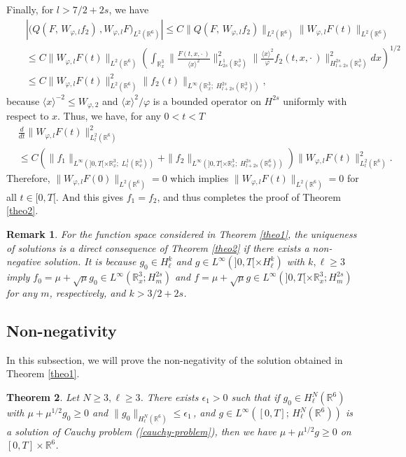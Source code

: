 \documentclass{amsart}[12pt, article]
\newtheorem{theo}{Theorem}[section]
\newtheorem{rema}[theo]{Remark}
\begin{document}
Finally, for $l>7/2+2s$, we have
\begin{eqnarray*}
&&\left|\Big(Q(F,\, W_{\varphi, l } f_2)\, ,W_{\varphi, l} F\Big)_{L^2({{{\mathbb R}}}^6)}\right|\leq C
\|Q( F,\, W_{\varphi,l} f_2)\|_{L^2({{{\mathbb R}}}^6)}\|W_{\varphi, l}F(t)\|_{L^2({{{\mathbb R}}}^6)}\\
&& \leq C \|W_{\varphi, l}F(t)\|_{L^2({{{\mathbb R}}}^6)} \left(\int_{{{{\mathbb R}}}^3_x}
\|\frac{F(t, x,\cdot\,)}{{{\langle}} x {{\rangle}}^2}\|^2_{L^{1}_{2s}({{{\mathbb R}}}^3_{v})}
\|\frac{{{\langle}} x {{\rangle}}^2}{\varphi}f_2(t, x, \cdot\,
)\|^2_{H^{2s}_{l+2s}({{{\mathbb R}}}^3_{v})} dx\right)^{1/2}\\
&&\leq C \|W_{\varphi,l}F(t)\|^2_{L^2({{{\mathbb R}}}^6)}\|f_2(t)\|_{L^\infty({{{\mathbb R}}}^3_x;\;
H^{2s}_{l+2s}({{{\mathbb R}}}^3_{v}))},
\end{eqnarray*}
because ${{\langle}} x {{\rangle}}^{-2} \leq W_{\varphi,2}$ and ${{\langle}} x {{\rangle}}^2/\varphi$ is a bounded
operator on $H^{2s}$ uniformly with respect to $x$.
Thus, we have, for any $0<t< T$
\begin{align*}
&\frac{d}{d t} \|W_{\varphi,l} F(t)\|^2_{L^2_l({{{\mathbb R}}}^6)} \\
&\leq C \left(
\|f_1\|_{L^\infty(]0, T[\times {{{\mathbb R}}}_x^3 ;\; L^1_{l}({{{\mathbb R}}}^3_{v}))}+
\|f_2\|_{L^\infty(]0, T[  \times {{{\mathbb R}}}_x^3;\; H^{2s}_{l+2s}({{{\mathbb R}}}^6_{v}))}
\right)\|W_{\varphi,l}F(t)\|^2_{L^2_{l}({{{\mathbb R}}}^6)}.
\end{align*}
Therefore, $\| W_{\varphi,l}F(0)\|_{L^2({{{\mathbb R}}}^6)}=0$ which implies $\|
W_{\varphi,l}F(t)\|_{L^2({{{\mathbb R}}}^6)}=0$ for all $t\in [0, T[$.
And this gives $f_1=f_2$, and thus completes the proof of Theorem \ref{theo2}.\\

\begin{rema}
For the function space considered in Theorem \ref{theo1}, the uniqueness of
solutions
is a direct consequence of Theorem \ref{theo2} if there exists a non-negative
solution. It is
because $g_0 \in H^k_{\ell}$ and $ g \in L^\infty(]0,T[\times H_{\ell}^k)$ with $k, \ell \geq 3$
imply
$f_0 = \mu + \sqrt \mu g_0 \in L^\infty({{{\mathbb R}}}_x^3; H^{2s}_m)$ and $f = \mu + \sqrt \mu g
\in L^\infty(]0,T[\times {{{\mathbb R}}}_x^3; H_m^{2s})$ for any $m$, respectively, and
$k > 3/2 + 2s$.
\end{rema}

\subsection{Non-negativity}\label{section4.4}
\setcounter{equation}{0}
In this subsection, we will prove the non-negativity of the solution
obtained in Theorem \ref{theo1}.
\begin{theo}\label{theo4.4.1}
Let $N\geq 3, \ell\geq 3$. There exists $\epsilon_1>0$ such that if
 $g_0\in H^N_\ell({{{\mathbb R}}}^6)$ with $\mu + \mu^{1/2} g_0\geq 0$ and
$ \|g_0\|_{H^N_\ell({{{\mathbb R}}}^6)}\leq \epsilon_1\,$, and $ g \in
L^\infty([0, T];\, H^N_\ell({{{\mathbb R}}}^6))$ is a solution of Cauchy problem
(\ref{cauchy-problem}), then we have $\mu + \mu^{1/2} g\geq 0$ on $
[0, T]\times{{{\mathbb R}}}^6$.
\end{theo}
\end{document}
